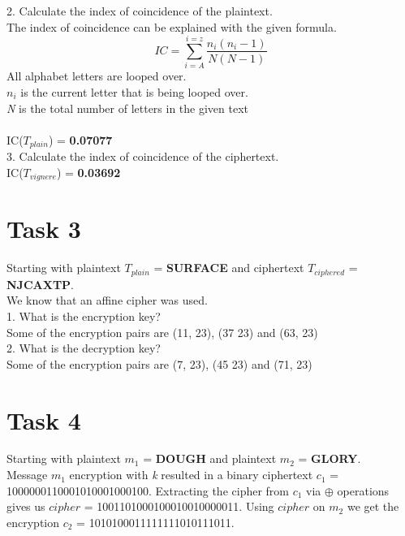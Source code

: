 \documentclass{article}
\begin{document}
2. Calculate the index of coincidence of the plaintext.\\
The index of coincidence can be explained with the given formula.
\[ IC = \sum_{i=A}^{i=z} \frac{n_i(n_i -1)}{N(N - 1)} \]
All alphabet letters are looped over. \\
\textit{$n_i$} is the current letter that is being looped over.\\
\textit{N} is the total number of letters in the given text\\\\
IC(\textit{$T_{plain}$}) = \textbf{0.07077}
\\

3. Calculate the index of coincidence of the ciphertext.\\
IC(\textit{$T_{vignere}$}) = \textbf{0.03692}



\section{Task 3}
Starting with plaintext \textit{$T_{plain}$} = \textbf{SURFACE} and ciphertext \textit{$T_{ciphered}$} = \textbf{NJCAXTP}. \\
We know that an affine cipher was used.\\

1. What is the encryption key?\\
Some of the encryption pairs are (11, 23), (37 23) and (63, 23)\\


2. What is the decryption key?\\
Some of the encryption pairs are (7, 23), (45 23) and (71, 23)\\





\section{Task 4}
Starting with plaintext \textit{$m_1$} = \textbf{DOUGH} and plaintext \textit{$m_2$} = \textbf{GLORY}. \\
Message \textit{$m_1$} encryption with \textit{k} resulted in a binary ciphertext \textit{$c_1$} = 1000000110001010001000100.
Extracting the cipher from \textit{$c_1$} via $\oplus$ operations gives us \textit{$cipher$} = 1001101000100010010000011.
Using \textit{$cipher$} on \textit{$m_2$} we get the encryption \textit{$c_2$} = 1010100011111111010111011.
\end{document}

